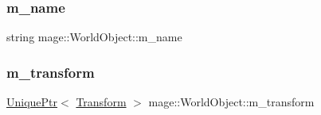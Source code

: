 \subsubsection{\texorpdfstring{m\+\_\+name}{m\_name}}
{\footnotesize\ttfamily string mage\+::\+World\+Object\+::m\+\_\+name\hspace{0.3cm}{\ttfamily [private]}}

\hypertarget{classmage_1_1_world_object_aa9b856a22731a70f9200e79d0f9a45ee}{}\label{classmage_1_1_world_object_aa9b856a22731a70f9200e79d0f9a45ee} 
\subsubsection{\texorpdfstring{m\+\_\+transform}{m\_transform}}
{\footnotesize\ttfamily \hyperlink{namespacemage_a8c307fbcc33bce9b7f2aa4c26c3b95cf}{Unique\+Ptr}$<$ \hyperlink{structmage_1_1_transform}{Transform} $>$ mage\+::\+World\+Object\+::m\+\_\+transform\hspace{0.3cm}{\ttfamily [private]}}


